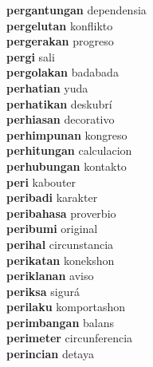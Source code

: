 \textbf{pergantungan } dependensia \\
\textbf{pergelutan } konflikto \\
\textbf{pergerakan } progreso \\
\textbf{pergi } sali \\
\textbf{pergolakan } badabada \\
\textbf{perhatian } yuda \\
\textbf{perhatikan } deskubrí \\
\textbf{perhiasan } decorativo \\
\textbf{perhimpunan } kongreso \\
\textbf{perhitungan } calculacion \\
\textbf{perhubungan } kontakto \\
\textbf{peri } kabouter \\
\textbf{peribadi } karakter \\
\textbf{peribahasa } proverbio \\
\textbf{peribumi } original \\
\textbf{perihal } circunstancia \\
\textbf{perikatan } konekshon \\
\textbf{periklanan } aviso \\
\textbf{periksa } sigurá \\
\textbf{perilaku } komportashon \\
\textbf{perimbangan } balans \\
\textbf{perimeter } circunferencia \\
\textbf{perincian } detaya \\
